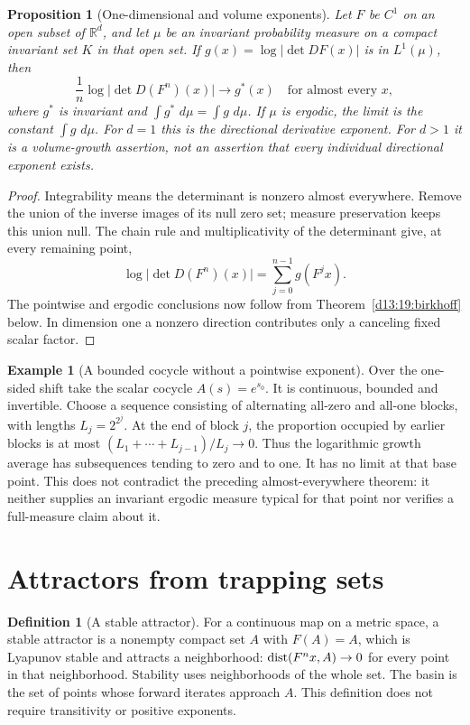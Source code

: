 \documentclass[11pt,oneside]{book}
\newtheorem{proposition}[theorem]{Proposition}
\theoremstyle{definition}
\newtheorem{definition}[theorem]{Definition}
\newtheorem{example}[theorem]{Example}
\theoremstyle{remark}\newtheorem{remark}[theorem]{Remark}
\newcommand{\R}{\mathbb R}\newcommand{\C}{\mathbb C}
\newcommand{\dd}{\,d}\newcommand{\id}{\operatorname{id}}
\newcommand{\abs}[1]{\lvert#1\rvert}\newcommand{\norm}[1]{\lVert#1\rVert}
\begin{document}
\begin{proposition}[One-dimensional and volume exponents]\label{d13:18:ergodic-exponents}
Let \(F\) be \(C^1\) on an open subset of \(\R^d\), and let
\(\mu\) be an invariant probability measure on a compact invariant
set \(K\) in that open set. If
\(g(x)=\log\abs{\det DF(x)}\) is in \(L^1(\mu)\), then
\[
 \frac1n\log\abs{\det D(F^n)(x)}
       \longrightarrow g^*(x)
 \quad\text{for almost every }x,
\]
where \(g^*\) is invariant and \(\int g^*\,\dd\mu=\int g\,\dd\mu\).
If \(\mu\) is ergodic, the limit is the constant \(\int g\,\dd\mu\).
For \(d=1\) this is the directional derivative exponent.
For \(d>1\) it is a volume-growth assertion, not an assertion that
every individual directional exponent exists.
\end{proposition}
\begin{proof}
Integrability means the determinant is nonzero almost everywhere.
Remove the union of the inverse images of its null zero set; measure
preservation keeps this union null. The chain rule and multiplicativity
of the determinant give, at every remaining point,
\[
 \log\abs{\det D(F^n)(x)}
       =\sum_{j=0}^{n-1}g(F^jx).
\]
The pointwise and ergodic conclusions now follow from
Theorem~\ref{d13:19:birkhoff} below. In dimension one a nonzero
direction contributes only a canceling fixed scalar factor.
\end{proof}

\begin{example}[A bounded cocycle without a pointwise exponent]
Over the one-sided shift take the scalar cocycle \(A(s)=e^{s_0}\).
It is continuous, bounded and invertible. Choose a sequence consisting
of alternating all-zero and all-one blocks, with lengths
\(L_j=2^{2^j}\). At the end of block \(j\), the proportion occupied
by earlier blocks is at most
\((L_1+\cdots+L_{j-1})/L_j\to0\).
Thus the logarithmic growth average has subsequences tending to zero
and to one. It has no limit at that base point.
This does not contradict the preceding almost-everywhere theorem:
it neither supplies an invariant ergodic measure typical for that
point nor verifies a full-measure claim about it.
\end{example}

\section{Attractors from trapping sets}

\begin{definition}[A stable attractor]\label{d13:18:attractor-definition}
For a continuous map on a metric space, a stable attractor is a
nonempty compact set \(A\) with \(F(A)=A\), which is Lyapunov stable
and attracts a neighborhood: \(\operatorname{dist}(F^nx,A)\to0\) for every point
in that neighborhood. Stability uses neighborhoods of the whole set.
The basin is the set of points whose forward iterates approach \(A\).
This definition does not require transitivity or positive exponents.
\end{definition}
\end{document}
